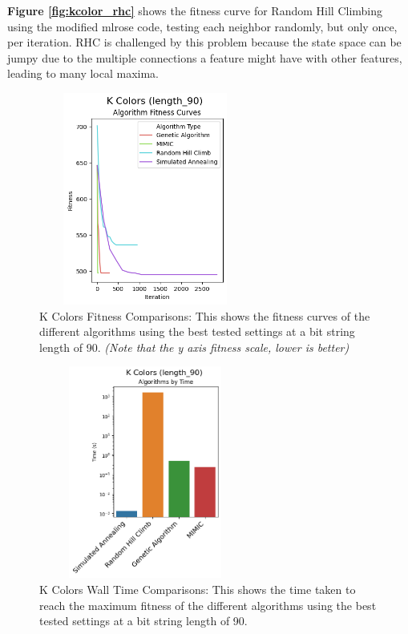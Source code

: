 \documentclass[letterpaper]{article} %
\begin{document}
\textbf{Figure \ref{fig:kcolor_rhc}} shows the fitness curve for Random Hill Climbing using the modified mlrose code, testing each neighbor randomly, but only once, per iteration.  RHC is challenged by this problem because the state space can be jumpy due to the multiple connections a feature might have with other features, leading to many local maxima.  


\begin{figure}[!htb]
\centering
\includegraphics[width=2.75in, height=2.75in]{figures/K_Colors_length_90_Algorithm_Fitness_Curves_.png}
\caption{K Colors Fitness Comparisons: This shows the fitness curves of the different algorithms using the best tested settings at a bit string length of 90. \emph{(Note that the y axis fitness scale, lower is better)} }
\label{fig:kcolor_fitness_comparison_90}
\end{figure}

\begin{figure}[!htb]
\centering
\includegraphics[width=2.75in, height=2.75in]{figures/K_Colors_length_90_Algorithms_by_Time_.png}
\caption{K Colors Wall Time Comparisons: This shows the time taken to reach the maximum fitness of the different algorithms using the best tested settings at a bit string length of 90.  }
\label{fig:kcolor_walltime_comparison_90}
\end{figure}
\end{document}
